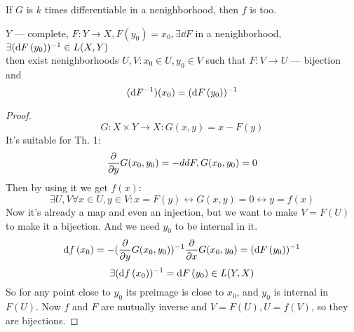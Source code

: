 \begin{thr}[Corollary] 
    If $G$ is $k$ times differentiable in a nenighborhood, then $f$ is too.
\end{thr}

\begin{thr}
    $Y$ --- complete, $F: Y \to X, F(y_0) = x_0, \exists \dd{F}$ in a nenighborhood, $\exists (\dd{F}\/(y_0))^{-1} \in L(X, Y)$ \\ 
    then exist nenighborhoods $U, V: x_0 \in U, y_0 \in V$ such that $F: V \to U$ --- bijection and
    \[ (\dd{F^{-1}})(x_0) = (\dd{F}\/(y_0))^{-1} \]  
\end{thr}
\begin{proof}
    \[ G: X \times Y \to X: G(x, y) = x - F(y) \]
    It's suitable for Th. 1:
    \[ \pdv{y} G\/(x_0, y_0) = -dd{F}, G(x_0, y_0) = 0 \]
    Then by using it we get $f(x)$:
    \[ \exists U, V \forall x \in U, y \in V : x = F(y) \leftrightarrow G(x, y) = 0 \leftrightarrow y = f(x) \]
    Now it's already a map and even an injection, but we want to make $V = F(U)$ to make it a bijection. And we need $y_0$ to be internal in it.
    \[ \dd{f}\/(x_0) = -(\pdv{y} G(x_0, y_0))^{-1} \pdv{x}\/G(x_0, y_0) = (\dd{F}\/(y_0))^{-1} \]
    \[ \exists (\dd{f}\/(x_0))^{-1} = \dd{F}\/(y_0) \in L(Y, X) \] 
    So for any point close to $y_0$ its preimage is close to $x_0$, and $y_0$ is internal in $F(U)$.
    Now $f$ and $F$ are mutually inverse and $V = F(U), U = f(V)$, so they are bijections.
\end{proof}
